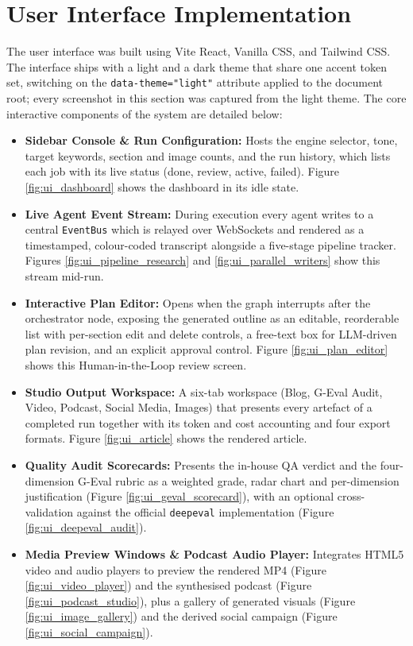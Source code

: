 \section{User Interface Implementation}

The user interface was built using Vite React, Vanilla CSS, and Tailwind CSS. The interface ships with a light and a dark theme that share one accent token set, switching on the \texttt{data-theme="light"} attribute applied to the document root; every screenshot in this section was captured from the light theme. The core interactive components of the system are detailed below:

\begin{itemize}
    \item \textbf{Sidebar Console \& Run Configuration:} Hosts the engine selector, tone, target keywords, section and image counts, and the run history, which lists each job with its live status (done, review, active, failed). Figure \ref{fig:ui_dashboard} shows the dashboard in its idle state.

    \item \textbf{Live Agent Event Stream:} During execution every agent writes to a central \texttt{EventBus} which is relayed over WebSockets and rendered as a timestamped, colour-coded transcript alongside a five-stage pipeline tracker. Figures \ref{fig:ui_pipeline_research} and \ref{fig:ui_parallel_writers} show this stream mid-run.

    \item \textbf{Interactive Plan Editor:} Opens when the graph interrupts after the orchestrator node, exposing the generated outline as an editable, reorderable list with per-section edit and delete controls, a free-text box for LLM-driven plan revision, and an explicit approval control. Figure \ref{fig:ui_plan_editor} shows this Human-in-the-Loop review screen.

    \item \textbf{Studio Output Workspace:} A six-tab workspace (Blog, G-Eval Audit, Video, Podcast, Social Media, Images) that presents every artefact of a completed run together with its token and cost accounting and four export formats. Figure \ref{fig:ui_article} shows the rendered article.

    \item \textbf{Quality Audit Scorecards:} Presents the in-house QA verdict and the four-dimension G-Eval rubric as a weighted grade, radar chart and per-dimension justification (Figure \ref{fig:ui_geval_scorecard}), with an optional cross-validation against the official \texttt{deepeval} implementation (Figure \ref{fig:ui_deepeval_audit}).

    \item \textbf{Media Preview Windows \& Podcast Audio Player:} Integrates HTML5 video and audio players to preview the rendered MP4 (Figure \ref{fig:ui_video_player}) and the synthesised podcast (Figure \ref{fig:ui_podcast_studio}), plus a gallery of generated visuals (Figure \ref{fig:ui_image_gallery}) and the derived social campaign (Figure \ref{fig:ui_social_campaign}).
\end{itemize}

